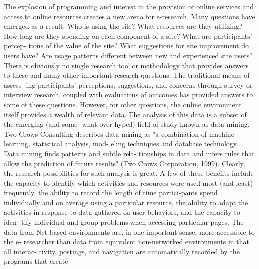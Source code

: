 \documentclass[a4paper,12pt]{article}
\begin{document}
\noindent
The explosion of programming and interest in the provision of online services and access to online resources creates a new arena for e-research. Many questions have emerged as a result. Who is using the site? What resources are they utilizing? How long are they spending on each component of a site? What are participants' percep- tions of the value of the site? What suggestions for site improvement do users have? Are usage patterns different between new and experienced site users? There is obviously no single research tool or methodology that provides answers to these and many other important research questions. The traditional means of assess- ing participants' perceptions, suggestions, and concerns through survey or interview research, coupled with evaluations of outcomes has provided answers to some of these questions. However, for other questions, the online environment itself provides a wealth of relevant data. The analysis of this data is a subset of the emerging (and some- what over-hyped) field of study known as data mining. Two Crows Consulting describes data mining as "a combination of machine learning, statistical analysis, mod- eling techniques and database technology. Data mining finds patterns and subtle rela- tionships in data and infers rules that allow the prediction of future results" (Two Crows Corporation, 1999). Clearly, the research possibilities for such analysis is great. A few of these benefits include the capacity to identify which activities and resources were used most (and least) frequently, the ability to record the length of time partici-pants spend individually and on average using a particular resource, the ability to adapt the activities in response to data gathered on user behaviors, and the capacity to iden- tify individual and group problems when accessing particular pages. The data from Net-based environments are, in one important sense, more accessible to the e- researcher than data from equivalent non-networked environments in that all interac- tivity, postings, and navigation are automatically recorded by the programs that create 
    
\end{document}
